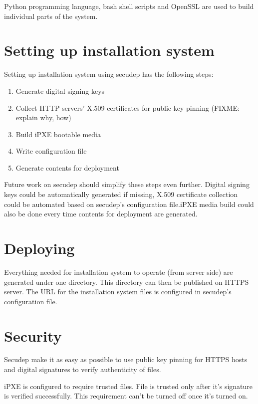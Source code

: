 Python programming language, bash shell scripts and OpenSSL are used
to build individual parts of the system.

\section{Setting up installation system}

Setting up installation system using secudep has the following steps:

\begin{enumerate}
  \item Generate digital signing keys
  \item Collect HTTP servers' X.509 certificates for public key pinning (FIXME: explain why, how)
  \item Build iPXE bootable media
  \item Write configuration file
  \item Generate contents for deployment
\end{enumerate}

Future work on secudep should simplify these steps even further.
Digital signing keys could be automatically generated if missing,
X.509 certificate collection could be automated based on secudep's
configuration file.\@ iPXE media build could also be done every time
contents for deployment are generated.

\section{Deploying}

Everything needed for installation system to operate (from server
side) are generated under one directory. This directory can then be
published on HTTPS server. The URL for the installation system files
is configured in secudep's configuration file.

\section{Security}

Secudep make it as easy as possible to use public key pinning for
HTTPS hosts and digital signatures to verify authenticity of files.

iPXE is configured to require trusted files. File is trusted only
after it's signature is verified successfully. This requirement can't
be turned off once it's turned on.
